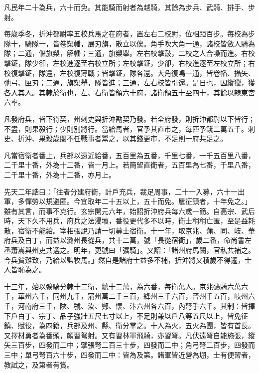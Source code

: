 \begin{pinyinscope}
 凡民年二十為兵，六十而免。其能騎而射者為越騎，其餘為步兵、武騎、排手、步射。



 每歲季冬，折沖都尉率五校兵馬之在府者，置左右二校尉，位相距百步。每校為步隊十，騎隊一，皆卷槊幡，展刃旗，散立以俟。角手吹大角一通，諸校皆斂人騎為隊；二通，偃旗槊，解幡；三通，旗槊舉。左右校擊鼓，二校之人合噪而進。右校擊鉦，隊少卻，左校進逐至右校立所；左校擊鉦，少卻，右校進逐至左校立所；右校復擊鉦，隊還，左校復薄戰；皆擊鉦，隊各還。大角復鳴一通，皆卷幡、攝矢、弛弓、匣刃；二通，旗槊舉，隊皆進；三通，左右校皆引還。是日也，因縱獵，獲各入其人。其隸於衛也，左、右衛皆領六十府，諸衛領五十至四十，其餘以隸東宮六率。



 凡發府兵，皆下符契，州刺史與折沖勘契乃發。若全府發，則折沖都尉以下皆行；不盡，則果毅行；少則別將行。當給馬者，官予其直市之，每匹予錢二萬五千。刺史、折沖、果毅歲閱不任戰事者鬻之，以其錢更市，不足則一府共足之。



 凡當宿衛者番上，兵部以遠近給番，五百里為五番，千里七番，一千五百里八番，二千里十番，外為十二番，皆一月上。若簡留直衛者，五百里為七番，千里八番，二千里十番，外為十二番，亦月上。



 先天二年誥曰：「往者分建府衛，計戶充兵，裁足周事，二十一入募，六十一出軍，多憚勞以規避匿。今宜取年二十五以上，五十而免。屢征鎮者，十年免之。」雖有其言，而事不克行。玄宗開元六年，始詔折沖府兵每六歲一簡。自高宗、武后時，天下久不用兵，府兵之法浸壞，番役更代多不以時，衛士稍稍亡匿，至是益耗散，宿衛不能給。宰相張說乃請一切募士宿衛。十一年，取京兆、蒲、同、岐、華府兵及白丁，而益以潞州長從兵，共十二萬，號「長從宿衛」，歲二番，命尚書左丞蕭嵩與州吏共選之。明年，更號曰「彍騎」。又詔：「諸州府馬闕，官私共補之。今兵貧難致，乃給以監牧馬。」然自是諸府士益多不補，折沖將又積歲不得遷，士人皆恥為之。



 十三年，始以彍騎分隸十二衛，總十二萬，為六番，每衛萬人。京兆彍騎六萬六千，華州六千，同州九千，蒲州萬二千三百，絳州三千六百，晉州千五百，岐州六千，河南府三千，陜、虢、汝、鄭、懷、汴六州各六百，內弩手六千。其制：皆擇下戶白丁、宗丁、品子強壯五尺七寸以上，不足則兼以戶八等五尺以上，皆免征鎮、賦役，為四籍，兵部及州、縣、衛分掌之。十人為火，五火為團，皆有首長。又擇材勇者為番頭，頗習弩射。又有習林軍飛騎，亦習弩。凡伏遠弩自能施張，縱矢三百步，四發而二中；擘張弩二百三十步，四發而二中；角弓弩二百步，四發而三中；單弓弩百六十步，四發而二中：皆為及第。諸軍皆近營為堋，士有便習者，教試之，及第者有賞。




\end{pinyinscope}
